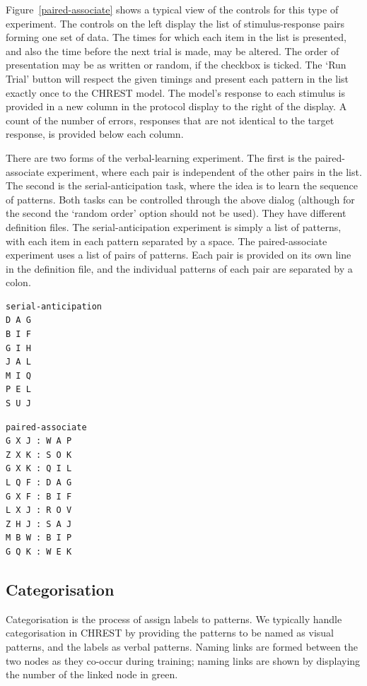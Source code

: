 \documentclass{article}
\begin{document}
Figure~\ref{paired-associate} shows a typical view of the controls for this
type of experiment.  The controls on the left display the list of
stimulus-response pairs forming one set of data.  The times for which each item
in the list is presented, and also the time before the next trial is made, may
be altered.  The order of presentation may be as written or random, if the
checkbox is ticked.  The  `Run Trial' button will respect the given timings and
present each pattern in the list exactly once to the CHREST model.  The model's
response to each stimulus is provided in a new column in the protocol display
to the right of the display.  A count of the number of errors, responses that
are not identical to the target response, is provided below each column.  

There are two forms of the verbal-learning experiment.  The first is the
paired-associate experiment, where each pair is independent of the other pairs
in the list.  The second is the serial-anticipation task, where the idea is to
learn the sequence of patterns.  Both tasks can be controlled through the above
dialog (although for the second the `random order' option should not be used).
They have different definition files.  The serial-anticipation experiment is
simply a list of patterns, with each item in each pattern separated by a space.
The paired-associate experiment uses a list of pairs of patterns.  Each pair is
provided on its own line in the definition file, and the individual patterns of
each pair are separated by a colon.

\begin{minipage}{0.5\textwidth}
\begin{verbatim}
serial-anticipation 
D A G 
B I F 
G I H 
J A L 
M I Q 
P E L 
S U J
\end{verbatim} 
\end{minipage}
\begin{minipage}{0.5\textwidth}
\begin{verbatim}
paired-associate 
G X J : W A P 
Z X K : S O K 
G X K : Q I L 
L Q F : D A G 
G X F : B I F 
L X J : R O V 
Z H J : S A J 
M B W : B I P 
G Q K : W E K
\end{verbatim}
\end{minipage}

\subsection{Categorisation}

Categorisation is the process of assign labels to patterns.  We typically
handle categorisation in CHREST by providing the patterns to be named as visual
patterns, and the labels as verbal patterns.  Naming links are formed between
the two nodes as they co-occur during training; naming links are shown by
displaying the number of the linked node in green.
\end{document}
